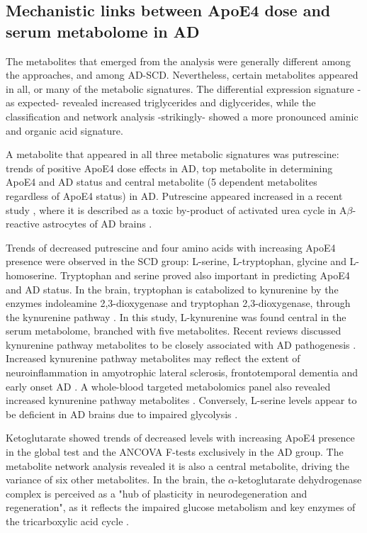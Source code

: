 \documentclass{amsart}
\begin{document}
\subsection{Mechanistic links between ApoE4 dose and serum metabolome in AD}
The metabolites that emerged from the analysis were generally different among the approaches, and among AD-SCD. Nevertheless, certain metabolites appeared in all, or many of the metabolic signatures. The differential expression signature -as expected- revealed increased triglycerides and diglycerides, while the classification and network analysis -strikingly- showed a more pronounced aminic and organic acid signature.

A metabolite that appeared in all three metabolic signatures was putrescine: trends of positive ApoE4 dose effects in AD, top metabolite in determining ApoE4 and AD status and central metabolite (5 dependent metabolites regardless of ApoE4 status) in AD. Putrescine appeared increased in a recent study \cite{Ju2021AstrocyticUC}, where it is described as a toxic by-product of activated urea cycle in A$\beta$-reactive astrocytes of AD brains \cite*{Ju2021AstrocyticUC,Wong2022PathogenicP}.

Trends of decreased putrescine and four amino acids with increasing ApoE4 presence were observed in the SCD group: L-serine, L-tryptophan, glycine and L-homoserine. Tryptophan and serine proved also important in predicting ApoE4 and AD status. In the brain, tryptophan is catabolized to kynurenine by the enzymes indoleamine 2,3-dioxygenase and tryptophan 2,3-dioxygenase, through the kynurenine pathway \cite*{Liang2022KynureninePM}. In this study, L-kynurenine was found central in the serum metabolome, branched with five  metabolites. Recent reviews discussed kynurenine pathway metabolites to be closely associated with AD pathogenesis \cite{Liang2022KynureninePM,Sharma2022KynurenineMA}. Increased kynurenine pathway metabolites may reflect the extent of neuroinflammation in amyotrophic lateral sclerosis, frontotemporal dementia and early onset AD \cite*{Heylen2023BrainKP}. A whole-blood targeted metabolomics panel also revealed increased kynurenine pathway metabolites \cite{Teruya2021WholebloodMO}. Conversely, L-serine levels appear to be deficient in AD brains due to impaired glycolysis \cite{LeDouce2020ImpairmentOG}. 

Ketoglutarate showed trends of decreased levels with increasing ApoE4 presence in the global test and the ANCOVA F-tests exclusively in the AD group. The metabolite network analysis revealed it is also a central metabolite, driving the variance of six other metabolites. In the brain, the $\alpha$-ketoglutarate dehydrogenase complex is perceived as a "hub of plasticity in neurodegeneration and regeneration", as it reflects the impaired glucose metabolism and key enzymes of the tricarboxylic acid cycle \cite*{Hansen2022TheD}.
\end{document}
